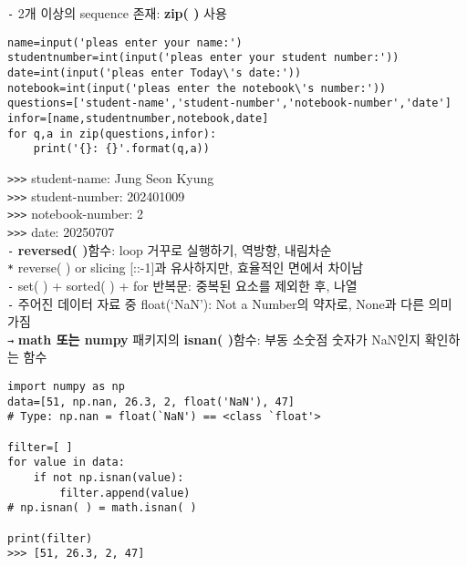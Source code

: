 \documentclass[11pt,a4paper]{article}
\begin{document}
\texttt{-} 2개 이상의 sequence 존재: \textbf{zip( )} 사용\\
\begin{lstlisting}[label={list:first}]
name=input('pleas enter your name:')
studentnumber=int(input('pleas enter your student number:'))
date=int(input('pleas enter Today\'s date:'))
notebook=int(input('pleas enter the notebook\'s number:'))
questions=['student-name','student-number','notebook-number','date']
infor=[name,studentnumber,notebook,date]
for q,a in zip(questions,infor):
    print('{}: {}'.format(q,a))
\end{lstlisting}
\verb|>>>| student-name: Jung Seon Kyung\\
\verb|>>>| student-number: 202401009\\
\verb|>>>| notebook-number: 2\\
\verb|>>>| date: 20250707\\

\texttt{-} \textbf{reversed( )}함수: loop 거꾸로 실행하기, 역방향, 내림차순\\
\hspace*{2em}\texttt{*} reverse( ) or slicing [::-1]과 유사하지만, 효율적인 면에서 차이남\\


\texttt{-} set( ) + sorted( ) + for 반복문: 중복된 요소를 제외한 후, 나열\\

\texttt{-} 주어진 데이터 자료 중 float(`NaN'): Not a Number의 약자로, None과 다른 의미 가짐\\
\hspace*{2em}\texttt{→} \textbf{math 또는 numpy} 패키지의 \textbf{isnan( )}함수: 부동 소숫점 숫자가 NaN인지 확인하는 함수\\
\begin{lstlisting}[label={list:first},caption=NaN and np.isnan( )]
import numpy as np
data=[51, np.nan, 26.3, 2, float('NaN'), 47]
# Type: np.nan = float(`NaN') == <class `float'>

filter=[ ]
for value in data:
    if not np.isnan(value):
        filter.append(value)
# np.isnan( ) = math.isnan( )

print(filter)
>>> [51, 26.3, 2, 47]
\end{lstlisting}
\end{document}
